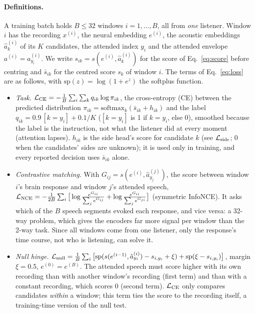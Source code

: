 \documentclass[10pt,twocolumn,letterpaper]{article}
\begin{document}
\paragraph{Definitions.} A training batch holds $B\le32$ windows $i=1,\dots,B$, all from \emph{one}
listener. Window $i$ has the recording $x^{(i)}$, the neural embedding $e^{(i)}$, the
acoustic embeddings $\hat a^{(i)}_k$ of its $K$ candidates, the attended index $y_i$ and the
attended envelope $a^{(i)}=a^{(i)}_{y_i}$. We write $s_{ik}=s(e^{(i)},\hat a^{(i)}_k)$ for the
score of Eq.~\ref{eq:score} before centring and $\bar s_{ik}$ for the centred score $s_k$ of
window $i$. The terms of Eq.~\ref{eq:loss} are as follows, with $\mathrm{sp}(z)=\log(1+e^z)$ the softplus function.
\begin{itemize}\setlength\itemsep{1pt}
\item \emph{Task.} $\mathcal L_{\rm CE}=-\frac1B\sum_i\sum_k q_{ik}\log\pi_{ik}$, the
cross-entropy (CE) between the predicted distribution $\pi_{ik}=\mathrm{softmax}_k(\bar s_{ik}+
h_{ik})$ and the label $q_{ik}=0.9\,[k{=}y_i]+0.1/K$ ($[k{=}y_i]$ is 1 if $k=y_i$, else 0), smoothed because the label is the
instruction, not what the listener did at every moment (attention lapses). $h_{ik}$ is the
side head's score for candidate $k$ (see $\mathcal L_{\rm side}$; 0 when the candidates'
sides are unknown); it is used only in training, and every reported decision uses
$\bar s_{ik}$ alone.
\item \emph{Contrastive matching.} With $G_{ij}=s(e^{(i)},\hat a^{(j)}_{y_j})$, the score
between window $i$'s brain response and window $j$'s attended speech,
$\mathcal L_{\rm NCE}=-\frac{1}{2B}\sum_i\big[\log\frac{e^{G_{ii}}}{\sum_j e^{G_{ij}}}+
\log\frac{e^{G_{ii}}}{\sum_j e^{G_{ji}}}\big]$ (symmetric InfoNCE). It asks which of the $B$
speech segments evoked each response, and vice versa: a 32-way problem, which gives the
encoders far more signal per window than the 2-way task. Since all windows come from one
listener, only the response's time course, not who is listening, can solve it.
\item \emph{Null hinge.} $\mathcal L_{\rm null}=\frac1B\sum_i\big[\mathrm{sp}(s(e^{(i-1)},
\hat a^{(i)}_{y_i})-s_{i,y_i}+\xi)+\mathrm{sp}(\xi-s_{i,y_i})\big]$, margin $\xi=0.5$,
$e^{(0)}=e^{(B)}$. The attended speech must score higher with its own recording than with
another window's recording (first term) and than with a constant recording, which scores 0
(second term). $\mathcal L_{\rm CE}$ only compares candidates \emph{within} a window; this
term ties the score to the recording itself, a training-time version of the null test.

\end{itemize}
\end{document}
